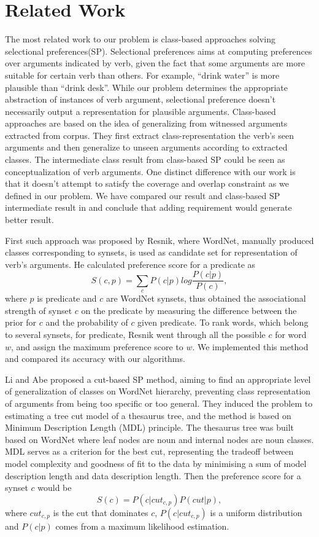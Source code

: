 \section{Related Work}
\label{sec:related}

The most related work to our problem is class-based approaches solving selectional preferences(SP). Selectional preferences aims at computing preferences over arguments indicated by verb, given the fact that some arguments are more suitable for certain verb than others. For example,
``drink water'' is more plausible than ``drink desk''.
While our problem determines the appropriate abstraction
of instances of verb argument, selectional preference
doesn't necessarily output a representation for plausible arguments.
Class-based approaches are based on the idea of
generalizing from witnessed arguments extracted from corpus.
They first extract class-representation the verb's seen arguments
and then generalize to unseen arguments according
to extracted classes.
The intermediate class result from class-based SP
could be seen as conceptualization of verb arguments. 
One distinct difference with our work is that it doesn't attempt to
satisfy the coverage and overlap constraint as we defined in
our problem.
We have compared our result and class-based SP intermediate result
in  and conclude that adding requirement would
generate better result.

First such approach was proposed by Resnik\cite{resnik1996selectional},
where WordNet\cite{wordnet}, manually produced classes corresponding
to synsets, is used as candidate set for representation of
verb's arguments. He calculated preference score for a predicate as
$$S(c,p)=\sum_{c}P(c|p)log\frac{P(c|p)}{P(c)},$$
where $p$ is predicate and $c$ are WordNet synsets,
thus obtained the associational strength of synset $c$
on the predicate by measuring the difference between the prior for $c$
and the probability of $c$ given predicate.
To rank words, which belong to several synsets, for predicate,
Resnik went through all the possible $c$ for word $w$,
and assign the maximum preference score to $w$. We implemented
this method and compared its accuracy with our algorithms.

Li and Abe\cite{li1998generalizing} proposed a cut-based SP method,
aiming to find an appropriate level of generalization of classes
on WordNet hierarchy, preventing class representation of arguments
from being too specific or too general. They induced the problem to
estimating a tree cut model of a thesaurus tree, and the method is
based on Minimum Description Length (MDL) principle.
The thesaurus tree was built based on WordNet where leaf nodes are
noun and internal nodes are noun classes.
MDL serves as a criterion for the best cut, representing the
tradeoff between model complexity and goodness of fit to the data
by minimising a sum of model description length and
data description length. Then the preference score for a synset
$c$ would be $$S(c)=P(c|cut_{c,p})P(cut|p),$$ where $cut_{c,p}$
is the cut that dominates $c$, $P(c|cut_{c,p})$ is a uniform
distribution and $P(c|p)$ comes from a maximum likelihood estimation.

